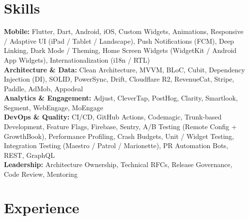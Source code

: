 \documentclass[10pt,a4paper]{article}
\begin{document}
    \section{Skills}\label{sec:skills}
    \textbf{Mobile:} Flutter, Dart, Android, iOS, Custom Widgets, Animations, Responsive / Adaptive UI (iPad / Tablet / Landscape), Push Notifications (FCM), Deep Linking, Dark Mode / Theming, Home Screen Widgets (WidgetKit / Android App Widgets), Internationalization (i18n / RTL) \\
    \textbf{Architecture \& Data:} Clean Architecture, MVVM, BLoC, Cubit, Dependency Injection (DI), SOLID, PowerSync, Drift, Cloudflare R2, RevenueCat, Stripe, Paddle, AdMob, Appodeal \\
    \textbf{Analytics \& Engagement:} Adjust, CleverTap, PostHog, Clarity, Smartlook, Segment, WebEngage, MoEngage\\
    \textbf{DevOps \& Quality:} CI/CD, GitHub Actions, Codemagic, Trunk-based Development, Feature Flags, Firebase, Sentry, A/B Testing (Remote Config + GrowthBook), Performance Profiling, Crash Budgets, Unit / Widget Testing, Integration Testing (Maestro / Patrol / Marionette), PR Automation Bots, REST, GraphQL \\
    \textbf{Leadership:} Architecture Ownership, Technical RFCs, Release Governance, Code Review, Mentoring



    \section{Experience}\label{sec:experience}
\end{document}
